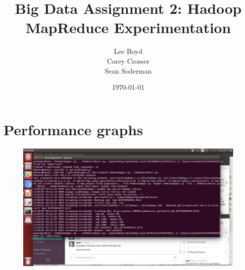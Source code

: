 \documentclass[14pt]{extarticle}
\begin{document}
\title{Big Data Assignment 2: Hadoop MapReduce Experimentation}
\author{Lee Boyd \\
        Corey Crosser \\
        Sean Soderman
        }
\date{\today}
\maketitle

\section{Performance graphs}

\begin{figure}[H]
\centering
\includegraphics[width=5.2in]{consolescrnshot.png}
\caption{}
\end{figure}

\end{document}
